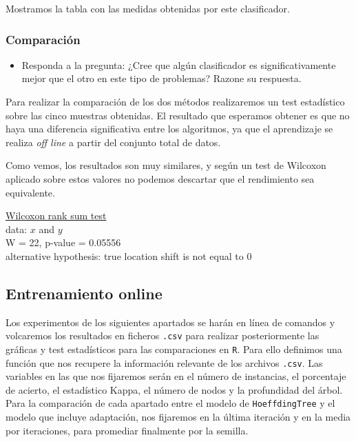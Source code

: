 \documentclass[11pt]{article}
\begin{document}
Mostramos la tabla con las medidas obtenidas por este clasificador. 

\subsubsection{Comparación}
\label{sec:orgfaa1a81}
\begin{itemize}
\item Responda a la pregunta: ¿Cree que algún clasificador es
significativamente mejor que el otro en este tipo de problemas?
Razone su respuesta.
\end{itemize}

Para realizar la comparación de los dos métodos realizaremos un test
estadístico sobre las cinco muestras obtenidas. El resultado que
esperamos obtener es que no haya una diferencia significativa entre
los algoritmos, ya que el aprendizaje se realiza \emph{off line} a partir
del conjunto total de datos. 

Como vemos, los resultados son muy similares, y según un test de
Wilcoxon aplicado sobre estos valores no podemos descartar que el
rendimiento sea equivalente.


	\underline{Wilcoxon rank sum test}\\

data:  $x$ and $y$ \\
W = 22, p-value = 0.05556 \\
alternative hypothesis: true location shift is not equal to $0$ \\


\subsection{Entrenamiento online}
\label{sec:org79a301f}

Los experimentos de los siguientes apartados se harán en línea de
comandos y volcaremos los resultados en ficheros \texttt{.csv} para realizar
posteriormente las gráficas y test estadísticos para las comparaciones
en \texttt{R}. Para ello definimos una función que nos recupere la
información relevante de los archivos \texttt{.csv}. Las variables en las que
nos fijaremos serán en el número de instancias, el porcentaje de
acierto, el estadístico Kappa, el número de nodos y la profundidad del
árbol. Para la comparación de cada apartado entre el modelo de
\texttt{HoeffdingTree} y el modelo que incluye adaptación, nos fijaremos en
la última iteración y en la media por iteraciones, para promediar
finalmente por la semilla. 
\end{document}
